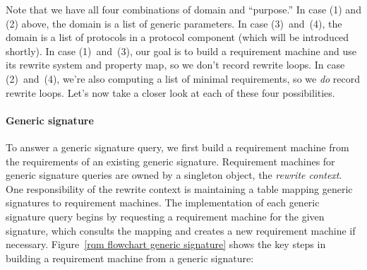 \documentclass[../generics]{subfiles}
\begin{document}
Note that we have all four combinations of domain and ``purpose.'' In case (1) and (2) above, the domain is a list of generic parameters. In case (3)~and~(4), the domain is a list of protocols in a protocol component (which will be introduced shortly). In case (1)~and~(3), our goal is to build a requirement machine and use its rewrite system and property map, so we don't record rewrite loops. In case (2)~and~(4), we're also computing a list of minimal requirements, so we \emph{do} record rewrite loops. Let's now take a closer look at each of these four possibilities.

\paragraph{Generic signature}
%
%
%
%
%
%
To answer a generic signature query, we first build a requirement machine from the requirements of an existing generic signature. Requirement machines for generic signature queries are owned by a singleton object, the \emph{rewrite context}. One responsibility of the rewrite context is maintaining a table mapping generic signatures to requirement machines. The implementation of each generic signature query begins by requesting a requirement machine for the given signature, which consults the mapping and creates a new requirement machine if necessary. Figure~\ref{rqm flowchart generic signature} shows the key steps in building a requirement machine from a generic signature:
\end{document}
